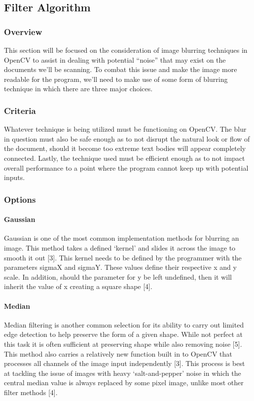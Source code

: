 \documentclass[article, onecolumn, draftclsnofoot,10pt, compsoc]{IEEEtran}
\begin{document}
\subsection{Filter Algorithm}
\subsubsection{Overview}
This section will be focused on the consideration of image blurring techniques in OpenCV to assist in dealing with potential “noise” that may exist on the documents we’ll be scanning. To combat this issue and make the image more readable for the program, we’ll need to make use of some form of blurring technique in which there are three major choices.

\subsubsection{Criteria}
Whatever technique is being utilized must be functioning on OpenCV. The blur in question must also be safe enough as to not disrupt the natural look or flow of the document, should it become too extreme text bodies will appear completely connected. Lastly, the technique used must be efficient enough as to not impact overall performance to a point where the program cannot keep up with potential inputs.

\subsubsection{Options}
\paragraph{Gaussian}
Gaussian is one of the most common implementation methods for blurring an image. This method takes a defined ‘kernel’ and slides it across the image to smooth it out [3]. This kernel needs to be defined by the programmer with the parameters sigmaX and sigmaY. These values define their respective x and y scale. In addition, should the parameter for y be left undefined, then it will inherit the value of x creating a square shape [4].

\paragraph{Median}
Median filtering is another common selection for its ability to carry out limited edge detection to help preserve the form of a given shape. While not perfect at this task it is often sufficient at preserving shape while also removing noise [5]. This method also carries a relatively new function built in to OpenCV that processes all channels of the image input independently [3]. This process is best at tackling the issue of images with heavy ‘salt-and-pepper’ noise in which the central median value is always replaced by some pixel image, unlike most other filter methods [4].
\end{document}
